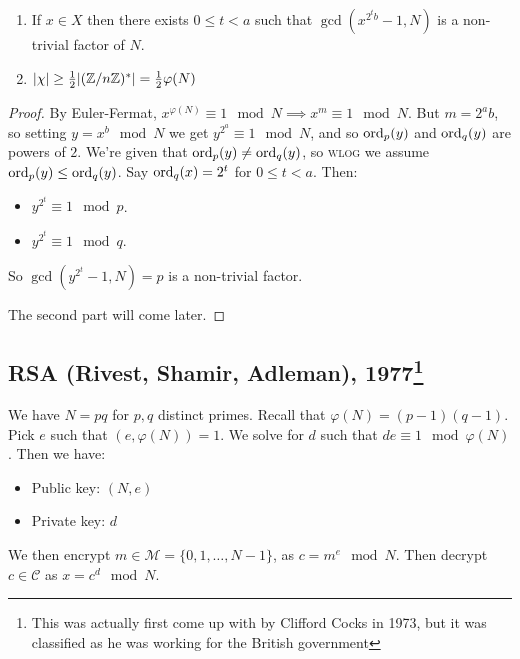 \documentclass[10pt,a4paper]{article}
\begin{document}
\begin{theorem}
\item
\begin{enumerate}
\item If $x \in X$ then there exists $0 \leq t < a$ such that $\gcd(x^{2^t b}-1, N)$ is a non-trivial factor of $N$.
\item $|\chi| \geq \frac{1}{2}|(\mathbb{Z}/n\mathbb{Z})^\ast| = \frac12 \varphi(N)$
\end{enumerate}
\end{theorem}
\begin{proof}
By Euler-Fermat, $x^{\varphi(N)}\equiv 1 \mod N \implies x^m \equiv 1 \mod N$. But $m = 2^a b$, so setting $y = x^b \mod N$ we get $y^{2^a} \equiv 1 \mod N$, and so $\operatorname{ord}_p(y)$ and $\operatorname{ord}_q(y)$ are powers of $2$. We're given that $\operatorname{ord}_p(y) \neq \operatorname{ord}_q(y)$, so \textsc{wlog} we assume $\operatorname{ord}_p(y) \leq \operatorname{ord}_q(y)$. Say $\operatorname{ord}_q(x) = 2^t$ for $0\leq t <a$. Then:
\begin{itemize}
\item $y^{2^t} \equiv 1 \mod p$.
\item $y^{2^t} \equiv 1 \mod q$.
\end{itemize}
So $\gcd(y^{2^t}-1, N) = p$ is a non-trivial factor.

The second part will come later.
\end{proof}

\subsection{RSA (Rivest, Shamir, Adleman), 1977\footnote{This was actually first come up with by Clifford Cocks in 1973, but it was classified as he was working for the British government}}
We have $N = pq$ for $p,q$ distinct primes. Recall that $\varphi(N) = (p-1)(q-1)$. Pick $e$ such that $(e, \varphi(N)) = 1$. We solve for $d$ such that $de \equiv 1 \mod \varphi(N)$. Then we have:
\begin{itemize}
\item Public key: $(N,e)$
\item Private key: $d$
\end{itemize}
We then encrypt $m \in \mathcal{M} = \{0,1,\ldots, N-1\}$, as $c = m^e\mod N$. Then decrypt $c \in \mathcal{C}$ as $x = c^d  \mod N$.
\end{document}

